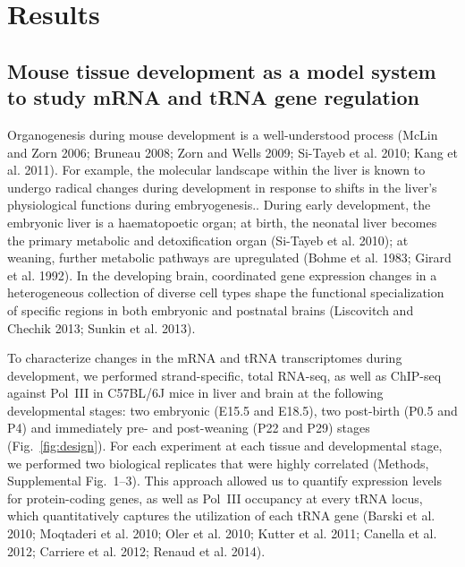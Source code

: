 \chapter{Results}

\section{Mouse tissue development as a model system to study mRNA and tRNA gene
regulation}

Organogenesis during mouse development is a well-understood process (McLin and
Zorn 2006; Bruneau 2008; Zorn and Wells 2009; Si-Tayeb et al. 2010; Kang et al.
2011). For example, the molecular landscape within the liver is known to undergo
radical changes during development in response to shifts in the liver’s
physiological functions during embryogenesis.. During early development, the
embryonic liver is a haematopoetic organ; at birth, the neonatal liver becomes
the pri\-ma\-ry metabolic and detoxification organ (Si-Tayeb et al. 2010); at
weaning, further metabolic pathways are upregulated (Bohme et al. 1983; Girard
et al. 1992). In the developing brain, coordinated gene expression changes in a
heterogeneous collection of diverse cell types shape the functional
specialization of specific regions in both embryonic and postnatal brains
(Liscovitch and Chechik 2013; Sunkin et al. 2013).

To characterize changes in the mRNA and tRNA transcriptomes during
development,
we performed strand-specific, total RNA-seq, as well as ChIP-seq against Pol~III
in C57BL/6J mice in liver and brain at the following developmental stages: two
embryonic (E15.5 and E18.5), two post-birth (P0.5 and P4) and immediately pre-
and post-weaning (P22 and P29) stages (Fig.~\ref{fig:design}). For each
experiment at each tissue and developmental stage, we performed two biological
replicates that were highly correlated (Methods, Supplemental Fig.~1–3). This
approach allowed us to quantify expression levels for protein-coding genes, as
well as Pol~III occupancy at every tRNA locus, which quantitatively captures the
utilization of each tRNA gene (Barski et al. 2010; Moqtaderi et al. 2010; Oler
et al. 2010; Kutter et al. 2011; Canella et al. 2012; Carriere et al. 2012;
Renaud et al. 2014).

